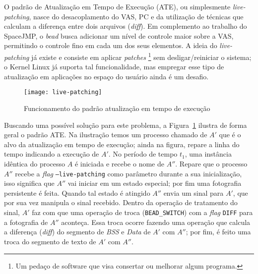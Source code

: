 O padrão de Atualização em Tempo de Execução (ATE), ou simplesmente
\emph{live-patching}, nasce do desacoplamento do VAS, PC e da utilização de
técnicas que calculam a diferença entre dois arquivos (\emph{diff}). Em
complemento ao trabalho do SpaceJMP, o \emph{bead} busca adicionar um nível de
controle maior sobre a VAS, permitindo o controle fino em cada um dos seus
elementos. A ideia do \emph{live-patching} já existe e consiste em aplicar
\emph{patches} \footnote{Um pedaço de software que visa consertar ou melhorar
algum programa.} sem desligar/reiniciar o sistema; o Kernel Linux já suporta
tal funcionalidade, mas empregar esse tipo de atualização em aplicações no
espaço do usuário ainda é um desafio.

\begin{figure}[!h]
  \centering
  \texttt{[image: live-patching]}
  \caption{Funcionamento do padrão atualização em tempo de execução}
  \label{fig:atr}
\end{figure}

Buscando uma possível solução para este problema, a Figura~\ref{fig:atr}
ilustra de forma geral o padrão ATE. Na ilustração temos um processo chamado de
$A'$ que é o alvo da atualização em tempo de execução; ainda na figura, repare a linha
do tempo indicando a execução de $A'$. No período de tempo $t_1$, uma instância
idêntica do processo $A$ é iniciada e recebe o nome de $A''$.  Repare que o
processo $A''$ recebe a \emph{flag} \texttt{--live-patching} como parâmetro
durante a sua inicialização, isso significa que $A''$ vai iniciar em um estado
especial; por fim uma fotografia persistente é feita. Quando tal estado é
atingido $A''$ envia um sinal para $A'$, que por sua vez manipula o sinal
recebido.  Dentro da operação de tratamento do sinal, $A'$ faz com que uma
operação de troca (\texttt{BEAD\_SWITCH}) com a \emph{flag} \texttt{DIFF} para
a fotografia de $A''$ aconteça. Essa troca ocorre fazendo uma operação que
calcula a diferença (\emph{diff}) do segmento de \emph{BSS} e \emph{Data} de
$A'$ com $A''$; por fim, é feito uma troca do segmento de texto de $A'$ com
$A''$.



